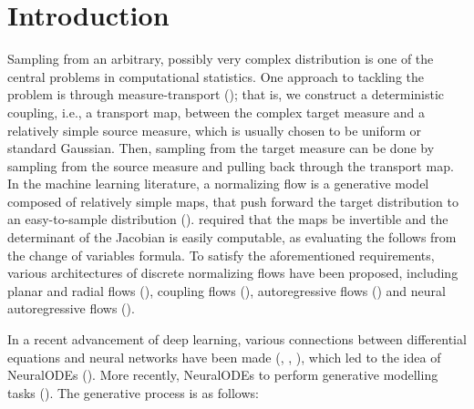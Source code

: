 \section{Introduction}
Sampling from an arbitrary, possibly very complex distribution is one
of the central problems in computational statistics. One approach to
tackling the problem is through measure-transport
(\cite{measure-transport}); that is, we construct a deterministic
coupling, i.e., a transport map, between the complex target measure
and a relatively simple source measure, which is usually chosen to be
uniform or standard Gaussian. Then, sampling from the target measure
can be done by sampling from the source measure and pulling back
through the transport map. In the machine learning literature, a
normalizing flow is  a generative model composed of
relatively simple maps, that push forward the target distribution to
an easy-to-sample distribution (\cite{NormalizingFlowIntro}).
required that the maps be
invertible and the determinant of the
Jacobian is easily computable, as evaluating the  follows
from the change of variables formula. To satisfy the aforementioned
requirements, various architectures of discrete normalizing flows have
been proposed, including planar and radial flows (\cite{PlanarFlow}),
coupling flows (\cite{CouplingFlows}), autoregressive flows
(\cite{autoregressiveflow}) and neural autoregressive flows
(\cite{NeuralAutoFlow}).

In a recent advancement of deep learning, various connections between
differential equations and neural networks have been made
(\cite{TransportAnalysisofDL}, \cite{NumericalSchemeODE},
\cite{PDEmotivatedNN}), which led to the idea of NeuralODEs
(\cite{NeuralODE}). More recently, NeuralODEs 
to perform generative modelling tasks (\cite{ffjord}). The generative
process is as follows:  

